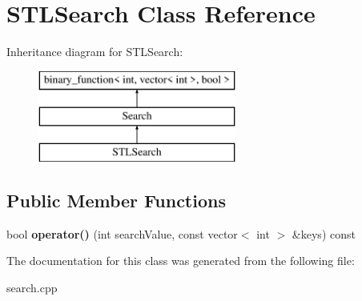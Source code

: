 \hypertarget{class_s_t_l_search}{\section{S\+T\+L\+Search Class Reference}
\label{class_s_t_l_search}
}
Inheritance diagram for S\+T\+L\+Search\+:\begin{figure}[H]
\begin{center}
\leavevmode
\includegraphics[height=3.000000cm]{class_s_t_l_search}
\end{center}
\end{figure}
\subsection*{Public Member Functions}
\begin{DoxyCompactItemize}
\item 
\hypertarget{class_s_t_l_search_a0f3684e33bd5e47317ab5a94d6f52dba}{bool {\bfseries operator()} (int search\+Value, const vector$<$ int $>$ \&keys) const }\label{class_s_t_l_search_a0f3684e33bd5e47317ab5a94d6f52dba}

\end{DoxyCompactItemize}


The documentation for this class was generated from the following file\+:\begin{DoxyCompactItemize}
\item 
search.\+cpp\end{DoxyCompactItemize}
